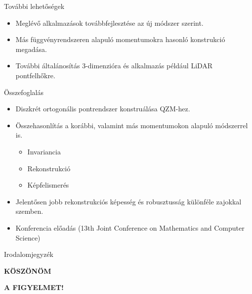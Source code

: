 \documentclass{beamer}
\begin{document}
\begin{frame}{További lehetőségek}
    \begin{itemize}
    \item Meglévő alkalmazások továbbfejlesztése az új módszer szerint.
    \item Más függvényrendszeren alapuló momentumokra hasonló konstrukció megadása.
    \item További általánosítás 3-dimenzióra és alkalmazás például LiDAR pontfelhőkre.
    \end{itemize}
\end{frame}

\begin{frame}{Összefoglalás}
    \begin{itemize}
    \item Diszkrét ortogonális pontrendszer konstruálása QZM-hez.
    \item Összehasonlítás a korábbi, valamint más momentumokon alapuló módszerrel is.
        \begin{itemize}
        \item Invariancia
        \item Rekonstrukció
        \item Képfelismerés
        \end{itemize}
    \item Jelentősen jobb rekonstrukciós képesség és robusztusság különféle zajokkal szemben.
    \item Konferencia előadás (13th Joint Conference on Mathematics and Computer Science)
    \end{itemize}
\end{frame}

\begin{frame}{Irodalomjegyzék}
\begin{footnotesize}
{}

\end{footnotesize}
\end{frame}


{
%
\begin{frame}{}

\textbf{\huge\color{white} KÖSZÖNÖM}

\bigskip

\textbf{\huge\color{white} A FIGYELMET!}

\end{frame}
}
\end{document}
